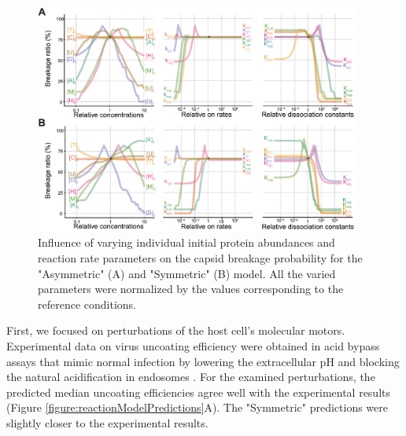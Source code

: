 \begin{figure}
\begin{center}
\includegraphics[width=0.95\textwidth, trim={0cm 0cm 0cm 0cm}, clip]{D_chapters/2_ReactionModel/SampledTrajectories.pdf}
\caption[Influence of varying individual initial protein abundances and reaction rate parameters on the capsid breakage probability]%
{Influence of varying individual initial protein abundances and reaction rate parameters on the capsid breakage probability for the "Asymmetric" (A) and "Symmetric" (B) model. All the varied parameters were normalized by the values corresponding to the reference conditions.}
\label{figure:sampledTrajectories}
\end{center}
\end{figure}

First, we focused on perturbations of the host cell’s molecular motors. Experimental data on virus uncoating efficiency were obtained in acid bypass assays that mimic normal infection by lowering the extracellular pH and blocking the natural acidification in endosomes \cite{banerjee2014influenza}. For the examined perturbations, the predicted median uncoating efficiencies agree well with the experimental results (Figure \ref{figure:reactionModelPredictions}A). The "Symmetric" predictions were slightly closer to the experimental results.

